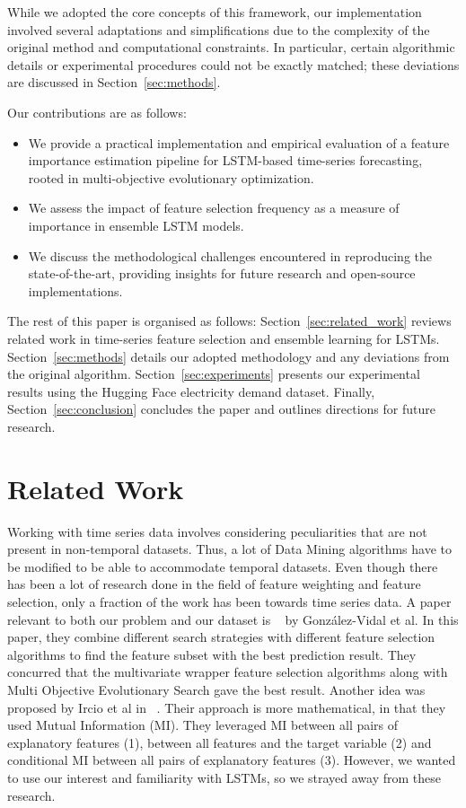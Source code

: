 \documentclass[12pt]{article}
\begin{document}
While we adopted the core concepts of this framework, our implementation involved several adaptations and simplifications due to the complexity of the original method and computational constraints. In particular, certain algorithmic details or experimental procedures could not be exactly matched; these deviations are discussed in Section~\ref{sec:methods}.

Our contributions are as follows:
\begin{itemize}
    \item We provide a practical implementation and empirical evaluation of a feature importance estimation pipeline for LSTM-based time-series forecasting, rooted in multi-objective evolutionary optimization.
    \item We assess the impact of feature selection frequency as a measure of importance in ensemble LSTM models.
    \item We discuss the methodological challenges encountered in reproducing the state-of-the-art, providing insights for future research and open-source implementations.
\end{itemize}

The rest of this paper is organised as follows: Section~\ref{sec:related_work} reviews related work in time-series feature selection and ensemble learning for LSTMs. Section~\ref{sec:methods} details our adopted methodology and any deviations from the original algorithm. Section~\ref{sec:experiments} presents our experimental results using the Hugging Face electricity demand dataset. Finally, Section~\ref{sec:conclusion} concludes the paper and outlines directions for future research.



\section{Related Work}
Working with time series data involves considering peculiarities that are not present in non-temporal datasets. Thus, a lot of Data Mining algorithms have to be modified to be able to accommodate temporal datasets. Even though there has been a lot of research done in the field of feature weighting and feature selection, only a fraction of the work has been towards time series data. A paper relevant to both our problem and our dataset is ~\cite{GONZALEZVIDAL201971} by González-Vidal et al. In this paper, they combine different search strategies with different feature selection algorithms to find the feature subset with the best prediction result. They concurred that the multivariate wrapper feature selection algorithms along with Multi Objective Evolutionary Search gave the best result. Another idea was proposed by Ircio et al in ~\cite{IRCIO2020107525}. Their approach is more mathematical, in that they used Mutual Information (MI). They leveraged MI between all pairs of explanatory features (1), between all features and the target variable (2) and conditional MI between all pairs of explanatory features (3). However, we wanted to use our interest and familiarity with LSTMs, so we strayed away from these research.
\end{document}

